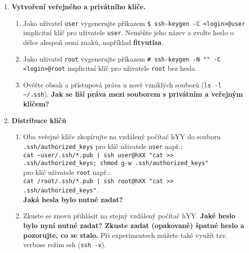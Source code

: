 \documentclass[a4paper,11pt]{article}
\begin{document}
\begin{enumerate}
\begin{enumerate}
    \end{enumerate}

  \item {\bf Vytvoření veřejného a privátního klíče.}

    \begin{enumerate}

      \item Jako uživatel {\tt user} vygenerujte příkazem \verb|$ ssh-keygen -C <login>@user|
        implicitní klíč pro uživatele
        {\tt user}. Neměňte jeho
        název a zvolte heslo o délce alespoň osmi znaků, například
        \textbf{fitvutisa}.

      \item Jako uživatel {\tt root} vygenerujte příkazem \verb|# ssh-keygen -N "" -C <login>@root|
        implicitní klíč pro uživatele {\tt root} bez hesla.

      \item Ověřte obsah a přístupová práva u nově vzniklých souborů (\verb|ls -l ~/.ssh|). {\bf Jak
se liší práva mezi souborem s privátním a veřejným klíčem?}

    \end{enumerate}

  \item {\bf Distribuce klíčů}

    \begin{enumerate}

      \item Oba veřejné klíče zkopírujte na vzdálený počítač hYY do
        souboru \verb|.ssh/authorized_keys|
        pro klíč uživatele {\tt user} např.: \\
        {\verb&cat ~user/.ssh/*.pub | ssh user@hXX "cat >> .ssh/authorized_keys; chmod g-w .ssh/authorized_keys"&} \\
        pro klíč uživatele {\tt root} např.: \\
        {\verb&cat /root/.ssh/*.pub | ssh root@hXX "cat >> .ssh/authorized_keys"&}. \\

      {\bf Jaká hesla bylo nutné zadat?}

      \item Zkuste se znovu přihlásit na stejný vzdálený počítač hYY. {\bf Jaké heslo bylo nyní nutné zadat? Zkuste
        zadat (opakovaně) špatné heslo a pozorujte, co se stalo.} Při experimentech můžete také
využít tzv. verbose režim ssh ({\tt ssh -v}).

    \end{enumerate}


\end{enumerate}
\end{document}
